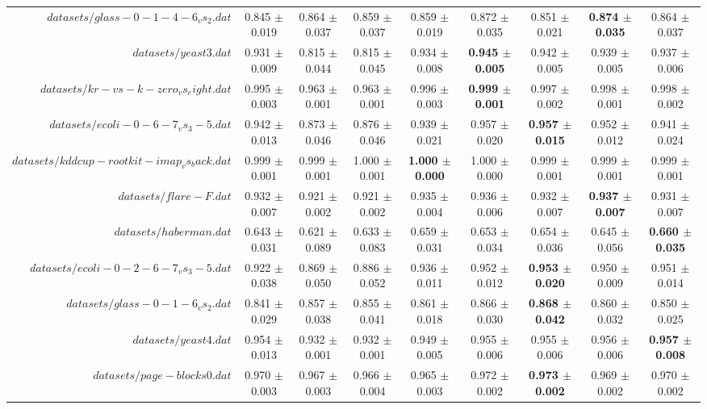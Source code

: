 \begin{table}[!ht]
{\begin{tabular}{r c c c c c c c c}
$datasets/glass-0-1-4-6_vs_2.dat$ & 0.845 $\pm$ 0.019 & 0.864 $\pm$ 0.037 & 0.859 $\pm$ 0.037 & 0.859 $\pm$ 0.019 & 0.872 $\pm$ 0.035 & 0.851 $\pm$ 0.021 & \textbf{0.874 $\pm$ 0.035} & 0.864 $\pm$ 0.037 \\
$datasets/yeast3.dat$ & 0.931 $\pm$ 0.009 & 0.815 $\pm$ 0.044 & 0.815 $\pm$ 0.045 & 0.934 $\pm$ 0.008 & \textbf{0.945 $\pm$ 0.005} & 0.942 $\pm$ 0.005 & 0.939 $\pm$ 0.005 & 0.937 $\pm$ 0.006 \\
$datasets/kr-vs-k-zero_vs_eight.dat$ & 0.995 $\pm$ 0.003 & 0.963 $\pm$ 0.001 & 0.963 $\pm$ 0.001 & 0.996 $\pm$ 0.003 & \textbf{0.999 $\pm$ 0.001} & 0.997 $\pm$ 0.002 & 0.998 $\pm$ 0.001 & 0.998 $\pm$ 0.002 \\
$datasets/ecoli-0-6-7_vs_3-5.dat$ & 0.942 $\pm$ 0.013 & 0.873 $\pm$ 0.046 & 0.876 $\pm$ 0.046 & 0.939 $\pm$ 0.021 & 0.957 $\pm$ 0.020 & \textbf{0.957 $\pm$ 0.015} & 0.952 $\pm$ 0.012 & 0.941 $\pm$ 0.024 \\
$datasets/kddcup-rootkit-imap_vs_back.dat$ & 0.999 $\pm$ 0.001 & 0.999 $\pm$ 0.001 & 1.000 $\pm$ 0.001 & \textbf{1.000 $\pm$ 0.000} & 1.000 $\pm$ 0.000 & 0.999 $\pm$ 0.001 & 0.999 $\pm$ 0.001 & 0.999 $\pm$ 0.001 \\
$datasets/flare-F.dat$ & 0.932 $\pm$ 0.007 & 0.921 $\pm$ 0.002 & 0.921 $\pm$ 0.002 & 0.935 $\pm$ 0.004 & 0.936 $\pm$ 0.006 & 0.932 $\pm$ 0.007 & \textbf{0.937 $\pm$ 0.007} & 0.931 $\pm$ 0.007 \\
$datasets/haberman.dat$ & 0.643 $\pm$ 0.031 & 0.621 $\pm$ 0.089 & 0.633 $\pm$ 0.083 & 0.659 $\pm$ 0.031 & 0.653 $\pm$ 0.034 & 0.654 $\pm$ 0.036 & 0.645 $\pm$ 0.056 & \textbf{0.660 $\pm$ 0.035} \\
$datasets/ecoli-0-2-6-7_vs_3-5.dat$ & 0.922 $\pm$ 0.038 & 0.869 $\pm$ 0.050 & 0.886 $\pm$ 0.052 & 0.936 $\pm$ 0.011 & 0.952 $\pm$ 0.012 & \textbf{0.953 $\pm$ 0.020} & 0.950 $\pm$ 0.009 & 0.951 $\pm$ 0.014 \\
$datasets/glass-0-1-6_vs_2.dat$ & 0.841 $\pm$ 0.029 & 0.857 $\pm$ 0.038 & 0.855 $\pm$ 0.041 & 0.861 $\pm$ 0.018 & 0.866 $\pm$ 0.030 & \textbf{0.868 $\pm$ 0.042} & 0.860 $\pm$ 0.032 & 0.850 $\pm$ 0.025 \\
$datasets/yeast4.dat$ & 0.954 $\pm$ 0.013 & 0.932 $\pm$ 0.001 & 0.932 $\pm$ 0.001 & 0.949 $\pm$ 0.005 & 0.955 $\pm$ 0.006 & 0.955 $\pm$ 0.006 & 0.956 $\pm$ 0.006 & \textbf{0.957 $\pm$ 0.008} \\
$datasets/page-blocks0.dat$ & 0.970 $\pm$ 0.003 & 0.967 $\pm$ 0.003 & 0.966 $\pm$ 0.004 & 0.965 $\pm$ 0.003 & 0.972 $\pm$ 0.002 & \textbf{0.973 $\pm$ 0.002} & 0.969 $\pm$ 0.002 & 0.970 $\pm$ 0.002 \\

\end{tabular}}
\end{table}
